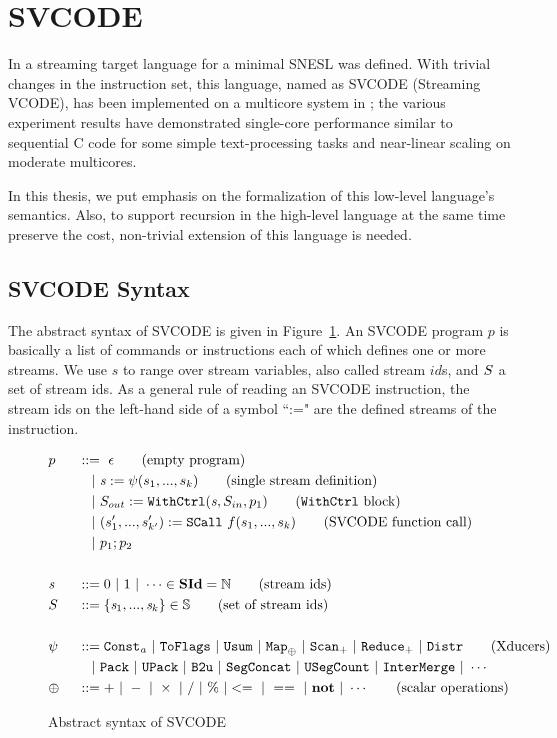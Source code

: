 \section{SVCODE}
In \cite{Fmaster} a streaming target language for a minimal SNESL was defined.
With trivial changes in the instruction set, this language, named as SVCODE (Streaming VCODE), has been implemented on a multicore system in \cite{MF16}; the various experiment results
have demonstrated single-core performance similar to sequential C code for some simple 
text-processing tasks and near-linear scaling on moderate multicores.

In this thesis, we put emphasis on the formalization of this low-level language's semantics.
Also, to support recursion in the high-level language at the same time preserve the cost, non-trivial extension of this language is needed. 

\subsection{SVCODE Syntax}

The abstract syntax of SVCODE is given in Figure~\ref{fig-svcode1-gram}.
An SVCODE program $p$ is basically a list of commands or instructions each of which defines one or more streams. 
We use $s$ to range over stream variables, also called stream $id$s, and $\S$ a set of stream ids.
As a general rule of reading an SVCODE instruction, the stream ids on the left-hand side of a symbol ``:=" are the defined streams of the instruction.


\begin{figure}[h] \large
	\begin{alignat*}{2}
	&p  && :: = \ \epsilon \tag{empty program}\\ 
	&   && \quad | \ \sdef{\s}{\psi(s_1,...,s_k)}  \tag{single stream definition}\\
	&   && \quad | \ \withctrl{\s}{p_1}{\Sin}{\Sout}  \tag{\wc block}\\
	&   && \quad | \ \scall{f}{s_1,...,s_k}{(s_1',...,s_{k'}')} \tag{SVCODE function call}\\
	&   && \quad | \ p_1;p_2  \\
	\\
	&\s && ::= 0 \ | \ 1 \ | \ \cdots \in \SId  = \mathbb{N}   \tag{stream ids}\\
	&  \S && ::= \{\s_1,..., \s_k\} \in \sset  \tag{set of stream ids}\\
	\\
	& \psi \ && ::= \consta{\mathit a} \ | \ \toflag  
	\ | \ \usum \ | \ \map{\oplus} \ | \ \genscan_{+} \ | \ \genreduce_{+} \ | \ \distr  \tag{Xducers}  \\
    &   && \quad | \ \pack \ | \ \upack \ | \ \bu \ | \ \segconcat \ | \ \usegcount \ | \ \intermerge \ | \ \cdots  \\
    & \oplus  \ && :: = + \ | \ - \ | \ \times \ |  \  / \ | \ \% \ | <= \ | \ == \ | \  \*{not} \ | \ \cdots \tag{scalar operations}
	\end{alignat*}
	\caption{Abstract syntax of SVCODE \label{fig-svcode1-gram}}
\end{figure}



